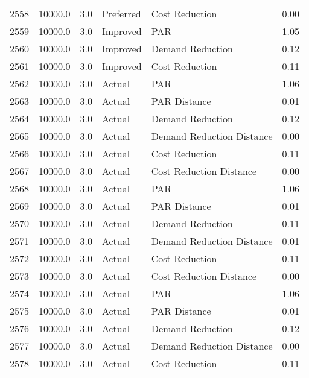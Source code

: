 \begin{longtable}{lrrllr}
2558 &      10000.0 &     3.0 &      Preferred &             Cost Reduction &   0.00 \\
2559 &      10000.0 &     3.0 &       Improved &                        PAR &   1.05 \\
2560 &      10000.0 &     3.0 &       Improved &           Demand Reduction &   0.12 \\
2561 &      10000.0 &     3.0 &       Improved &             Cost Reduction &   0.11 \\
2562 &      10000.0 &     3.0 &         Actual &                        PAR &   1.06 \\
2563 &      10000.0 &     3.0 &         Actual &               PAR Distance &   0.01 \\
2564 &      10000.0 &     3.0 &         Actual &           Demand Reduction &   0.12 \\
2565 &      10000.0 &     3.0 &         Actual &  Demand Reduction Distance &   0.00 \\
2566 &      10000.0 &     3.0 &         Actual &             Cost Reduction &   0.11 \\
2567 &      10000.0 &     3.0 &         Actual &    Cost Reduction Distance &   0.00 \\
2568 &      10000.0 &     3.0 &         Actual &                        PAR &   1.06 \\
2569 &      10000.0 &     3.0 &         Actual &               PAR Distance &   0.01 \\
2570 &      10000.0 &     3.0 &         Actual &           Demand Reduction &   0.11 \\
2571 &      10000.0 &     3.0 &         Actual &  Demand Reduction Distance &   0.01 \\
2572 &      10000.0 &     3.0 &         Actual &             Cost Reduction &   0.11 \\
2573 &      10000.0 &     3.0 &         Actual &    Cost Reduction Distance &   0.00 \\
2574 &      10000.0 &     3.0 &         Actual &                        PAR &   1.06 \\
2575 &      10000.0 &     3.0 &         Actual &               PAR Distance &   0.01 \\
2576 &      10000.0 &     3.0 &         Actual &           Demand Reduction &   0.12 \\
2577 &      10000.0 &     3.0 &         Actual &  Demand Reduction Distance &   0.00 \\
2578 &      10000.0 &     3.0 &         Actual &             Cost Reduction &   0.11 \\

\end{longtable}
